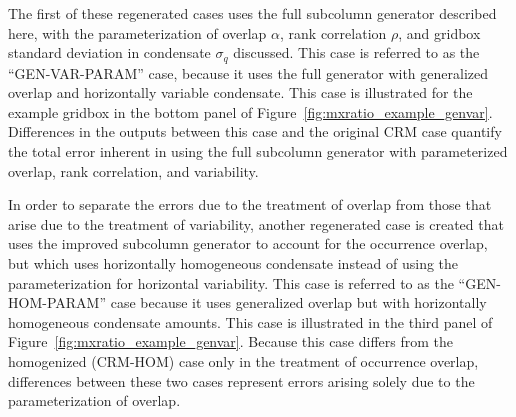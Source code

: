 The first of these regenerated cases uses the full subcolumn generator
described here, with the parameterization of overlap \(\alpha\), rank
correlation \(\rho\), and gridbox standard deviation in condensate
\(\sigma_q\) discussed. This case is referred to as the
``GEN-VAR-PARAM'' case, because it uses the full generator with
generalized overlap and horizontally variable condensate. This case is
illustrated for the example gridbox in the bottom panel of
Figure~\ref{fig:mxratio_example_genvar}. Differences in the outputs
between this case and the original CRM case quantify the total error
inherent in using the full subcolumn generator with parameterized
overlap, rank correlation, and variability.

In order to separate the errors due to the treatment of overlap from
those that arise due to the treatment of variability, another
regenerated case is created that uses the improved subcolumn generator
to account for the occurrence overlap, but which uses horizontally
homogeneous condensate instead of using the parameterization for
horizontal variability. This case is referred to as the
``GEN-HOM-PARAM'' case because it uses generalized overlap but with
horizontally homogeneous condensate amounts. This case is illustrated in
the third panel of Figure~\ref{fig:mxratio_example_genvar}. Because this
case differs from the homogenized (CRM-HOM) case only in the treatment
of occurrence overlap, differences between these two cases represent
errors arising solely due to the parameterization of overlap.

